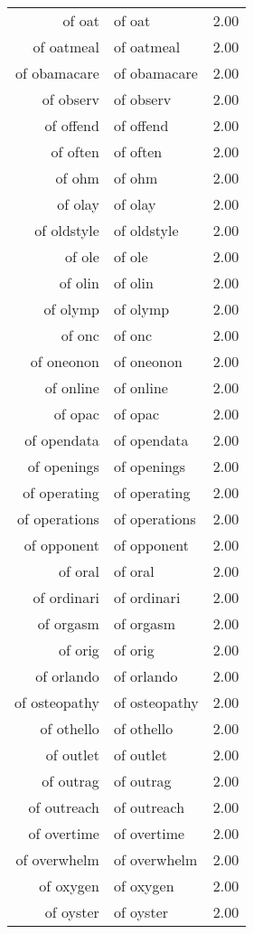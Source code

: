 \begin{table}[ht]
\begin{tabular}{rlr}
  of oat & of oat & 2.00 \\ 
  of oatmeal & of oatmeal & 2.00 \\ 
  of obamacare & of obamacare & 2.00 \\ 
  of observ & of observ & 2.00 \\ 
  of offend & of offend & 2.00 \\ 
  of often & of often & 2.00 \\ 
  of ohm & of ohm & 2.00 \\ 
  of olay & of olay & 2.00 \\ 
  of oldstyle & of oldstyle & 2.00 \\ 
  of ole & of ole & 2.00 \\ 
  of olin & of olin & 2.00 \\ 
  of olymp & of olymp & 2.00 \\ 
  of onc & of onc & 2.00 \\ 
  of oneonon & of oneonon & 2.00 \\ 
  of online & of online & 2.00 \\ 
  of opac & of opac & 2.00 \\ 
  of opendata & of opendata & 2.00 \\ 
  of openings & of openings & 2.00 \\ 
  of operating & of operating & 2.00 \\ 
  of operations & of operations & 2.00 \\ 
  of opponent & of opponent & 2.00 \\ 
  of oral & of oral & 2.00 \\ 
  of ordinari & of ordinari & 2.00 \\ 
  of orgasm & of orgasm & 2.00 \\ 
  of orig & of orig & 2.00 \\ 
  of orlando & of orlando & 2.00 \\ 
  of osteopathy & of osteopathy & 2.00 \\ 
  of othello & of othello & 2.00 \\ 
  of outlet & of outlet & 2.00 \\ 
  of outrag & of outrag & 2.00 \\ 
  of outreach & of outreach & 2.00 \\ 
  of overtime & of overtime & 2.00 \\ 
  of overwhelm & of overwhelm & 2.00 \\ 
  of oxygen & of oxygen & 2.00 \\ 
  of oyster & of oyster & 2.00 \\ 

\end{tabular}
\end{table}
